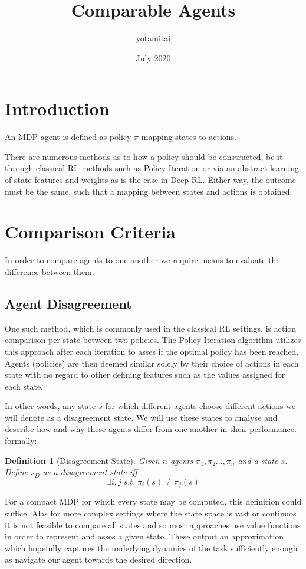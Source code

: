 \documentclass{article}
\title{Comparable Agents}
\author{yotamitai }
\date{July 2020}
\newtheorem{definition}{Definition}
\begin{document}
\maketitle

\section{Introduction}
An MDP agent is defined as policy $\pi$ mapping states to actions.

There are numerous methods as to how a policy should be constructed, be it
through classical RL methods such as Policy Iteration or via an abstract
learning of state features and weights as is the case in Deep RL.
Either way, the outcome must be the same, such that a mapping between states and actions is
obtained.

\section{Comparison Criteria}
In order to compare agents to one another we require means to evaluate the difference between them.

\subsection{Agent Disagreement}
One such method, which is commonly used in the classical RL settings, is action comparison per state
between two policies. The Policy Iteration algorithm utilizes this approach after each iteration to
asses if the optimal policy has been reached. Agents (policies) are then deemed
similar solely by their choice of actions in each state with no regard to other defining features
such as the values assigned for each state.

In other words, any state $s$ for which different agents choose different actions we will denote as
a disagreement state. We will use these states to analyse and describe how and why these agents
differ from one another in their performance. formally:
\begin{definition}[Disagreement State]
    Given $n$ agents $\pi_1,\pi_2...,\pi_n$ and a state $s$. Define $s_D$ as a disagreement state
    iff  \[\exists i,j \; s.t. \; \pi_i(s) \neq \pi_j(s)\]
\end{definition} 

For a compact MDP for which every state may be computed, this definition could suffice.
Alas for more complex settings where the state space is vast or continuos it is not feasible to
compare all states and so most approaches use value functions in order to represent and asses a
given state. These output an approximation which hopefully captures the underlying dynamics of the
task sufficiently enough as navigate our agent towards the desired direction. 
\end{document}
